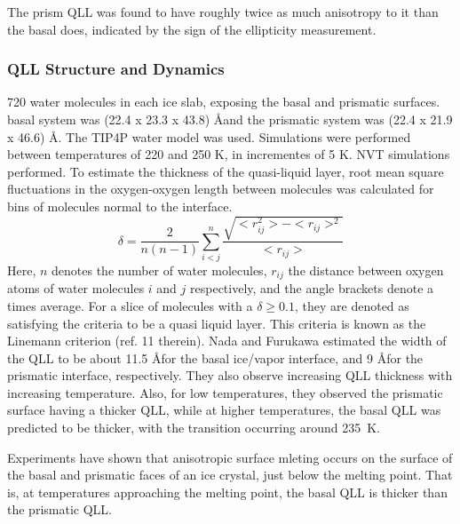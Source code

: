 The prism QLL was found to have roughly twice as much anisotropy to it
than the basal does, indicated by the sign of the ellipticity
measurement.
\subsubsection{QLL Structure and Dynamics}

720 water molecules in each ice slab, exposing the basal and prismatic
surfaces. basal system was (22.4 x 23.3 x 43.8) \AA and the prismatic
system was (22.4 x 21.9 x 46.6) \AA. The TIP4P water model was
used. Simulations were performed between temperatures of 220 and 250
K, in incrementes of 5 K. NVT simulations performed. To estimate the
thickness of the quasi-liquid layer, root mean square fluctuations in
the oxygen-oxygen length between molecules was calculated for bins of
molecules normal to the interface.
\begin{equation}\label{eqNada1997-1}
\delta = \frac{2}{n(n-1)} \sum_{i<j}^{n}
\frac{\sqrt{<r_{ij}^{2}>-<r_{ij}>^{2}}}{<r_{ij}>}
\end{equation}
Here, $n$ denotes the number of water molecules, $r_{ij}$ the distance
between oxygen atoms of water molecules $i$ and $j$ respectively, and
the angle brackets denote a times average. For a slice of molecules
with a $\delta \ge 0.1$, they are denoted as satisfying the criteria
to be a quasi liquid layer. This criteria is known as the Linemann
criterion (ref. 11 therein). Nada and Furukawa estimated the width of
the QLL to be about 11.5 \AA for the basal ice/vapor interface, and 9
\AA for the prismatic interface, respectively. They also observe
increasing QLL thickness with increasing temperature. Also, for low
temperatures, they observed the prismatic surface having a thicker
QLL, while at higher temperatures, the basal QLL was predicted to be
thicker, with the transition occurring around 235~K. \cite{Nada1997}

Experiments have shown that anisotropic surface mleting occurs on the
surface of the basal and prismatic faces of an ice crystal, just below
the melting point. That is, at temperatures approaching the melting
point, the basal QLL is thicker than the prismatic QLL. 

